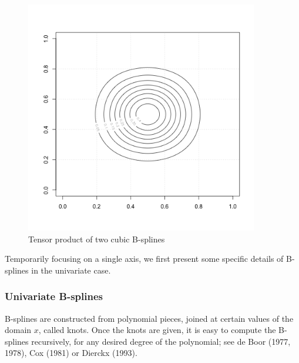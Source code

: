 \documentclass[12pt]{article}
\newcommand*\needsparaphrased{\color{red}}
\newcommand*\outlineskeleton{\color{green}}
\begin{document}
\begin{figure}[H]
  \centering
  \graphicspath{{img/}}
  \includegraphics[width=4in, height=4in]{bicubic_bspline_contour.png}
  \caption{Tensor product of two cubic B-splines}\label{fig:bicubic_bspline_contour}
\end{figure} 

Temporarily focusing on a single axis, we first present some specific details of B-splines in the univariate case. 
\subsubsection{{\outlineskeleton Univariate B-splines}}

{\needsparaphrased B-splines are constructed from polynomial pieces, joined at certain values of the domain $x$, called knots. Once the knots are given, it is easy to compute the B-splines recursively, for any desired degree of the polynomial; see de Boor (1977, 1978), Cox (1981) or Dierckx (1993).  }
\end{document}
